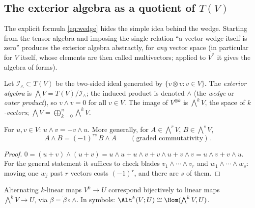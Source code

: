 \subsection{The exterior algebra as a quotient of $T(V)$}\label{sec:extquotient}

The explicit formula \eqref{eq:wedge} hides the simple idea behind the wedge. Starting from the tensor algebra and imposing the
single relation ``a vector wedge itself is zero'' produces the exterior algebra abstractly, for \emph{any} vector space
(in particular for $V$ itself, whose elements are then called multivectors; applied to $V^*$ it gives the algebra of forms).
\begin{definition}
Let $\mathcal I_\wedge\subset T(V)$ be the two-sided ideal generated by $\{v\otimes v: v\in V\}$.
The \emph{exterior algebra} is $\bigwedge V=T(V)/\mathcal I_\wedge$; the induced product is denoted $\wedge$
(the \emph{wedge} or \emph{outer product}), so $v\wedge v=0$ for all $v\in V$. The image of $V^{\otimes k}$ is
$\bigwedge^kV$, the space of \emph{$k$-vectors}; $\bigwedge V=\bigoplus_{k=0}^n\bigwedge^kV$.
\end{definition}

\begin{proposition}[Anticommutativity]\label{prop:anti}
For $u,v\in V$: $u\wedge v=-v\wedge u$. More generally, for $A\in\bigwedge^rV$, $B\in\bigwedge^sV$,
\[
 A\wedge B=(-1)^{rs}\,B\wedge A\qquad(\text{graded commutativity}).
\]
\end{proposition}
\begin{proof}
$0=(u+v)\wedge(u+v)=u\wedge u+u\wedge v+v\wedge u+v\wedge v=u\wedge v+v\wedge u$. For the general statement it suffices
to check blades $v_1\wedge\cdots\wedge v_r$ and $w_1\wedge\cdots\wedge w_s$: moving one $w_j$ past $r$ vectors costs $(-1)^r$,
and there are $s$ of them.
\end{proof}

\begin{theorem}\label{thm:extuniv}
Alternating $k$-linear maps $V^k\to U$ correspond bijectively to linear maps $\bigwedge^kV\to U$,
via $\beta=\tilde\beta\circ\wedge$. In symbols: $\Alt^k(V;U)\cong\Hom(\bigwedge^kV,U)$.
\end{theorem}

